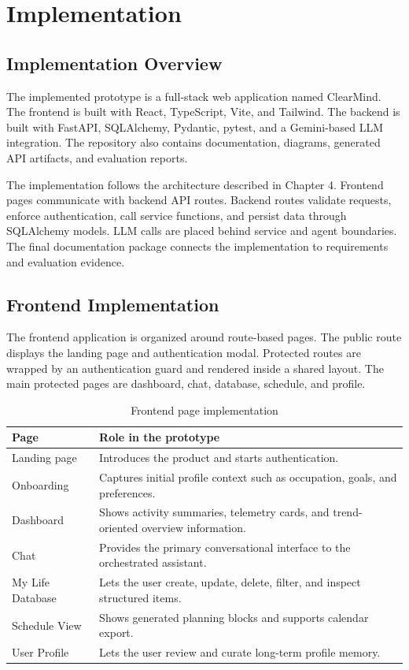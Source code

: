 \chapter{Implementation}

\section{Implementation Overview}

The implemented prototype is a full-stack web application named ClearMind. The frontend is built with React, TypeScript, Vite, and Tailwind. The backend is built with FastAPI, SQLAlchemy, Pydantic, pytest, and a Gemini-based LLM integration. The repository also contains documentation, diagrams, generated API artifacts, and evaluation reports.

The implementation follows the architecture described in Chapter 4. Frontend pages communicate with backend API routes. Backend routes validate requests, enforce authentication, call service functions, and persist data through SQLAlchemy models. LLM calls are placed behind service and agent boundaries. The final documentation package connects the implementation to requirements and evaluation evidence.

\section{Frontend Implementation}

The frontend application is organized around route-based pages. The public route displays the landing page and authentication modal. Protected routes are wrapped by an authentication guard and rendered inside a shared layout. The main protected pages are dashboard, chat, database, schedule, and profile.

\begin{table}[H]
\centering
\caption{Frontend page implementation}
\label{tab:frontend-pages}
\begin{tabular}{|p{}|p{}|}
\hline
\textbf{Page} & \textbf{Role in the prototype}\\
\hline
Landing page & Introduces the product and starts authentication.\\
\hline
Onboarding & Captures initial profile context such as occupation, goals, and preferences.\\
\hline
Dashboard & Shows activity summaries, telemetry cards, and trend-oriented overview information.\\
\hline
Chat & Provides the primary conversational interface to the orchestrated assistant.\\
\hline
My Life Database & Lets the user create, update, delete, filter, and inspect structured items.\\
\hline
Schedule View & Shows generated planning blocks and supports calendar export.\\
\hline
User Profile & Lets the user review and curate long-term profile memory.\\
\hline
\end{tabular}
\end{table}

